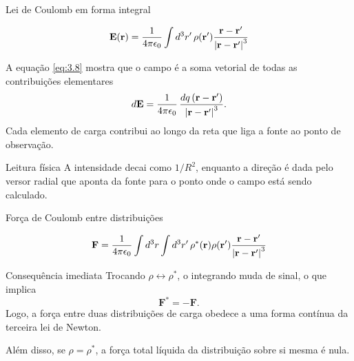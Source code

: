 \documentclass[aspectratio=169,11pt]{beamer}
\newcommand{\E}{\mathbf{E}}
\newcommand{\F}{\mathbf{F}}
\newcommand{\rr}{\mathbf{r}}
\begin{document}
\begin{frame}{Lei de Coulomb em forma integral}
\begin{eqbox}
\begin{equation}
\E(\rr)=
\frac{1}{4\pi\epsilon_0}
\int d^3r'\,\rho(\rr')
\frac{\rr-\rr'}{\abs{\rr-\rr'}^3}
\label{eq:3.8}
\end{equation}
\end{eqbox}

\vspace{0.1cm}

\begin{mybox}
\justifying
A equação \eqref{eq:3.8} mostra que o campo é a soma vetorial de todas as contribuições elementares
\[
d\E=
\frac{1}{4\pi\epsilon_0}\,
\frac{dq\,(\rr-\rr')}{\abs{\rr-\rr'}^3}.
\]
Cada elemento de carga contribui ao longo da reta que liga a fonte ao ponto de observação.
\end{mybox}

\vspace{0.1cm}

\begin{alertblock}{Leitura física}
\justifying
A intensidade decai como \(1/R^2\), enquanto a direção é dada pelo versor radial que aponta da fonte para o ponto onde o campo está sendo calculado.
\end{alertblock}
\end{frame}

\begin{frame}{Força de Coulomb entre distribuições}
\begin{eqbox}
\begin{equation}
\F=
\frac{1}{4\pi\epsilon_0}
\int d^3r \int d^3r'\,
\rho^\ast(\rr)\rho(\rr')
\frac{\rr-\rr'}{\abs{\rr-\rr'}^3}
\label{eq:3.9}
\end{equation}
\end{eqbox}

\vspace{0.25cm}

\begin{block}{Consequência imediata}
\justifying
Trocando \(\rho\leftrightarrow \rho^\ast\), o integrando muda de sinal, o que implica
\[
\F^\ast=-\F.
\]
Logo, a força entre duas distribuições de carga obedece a uma forma contínua da terceira lei de Newton.
\end{block}

\begin{mybox}
\justifying
Além disso, se \(\rho=\rho^\ast\), a força total líquida da distribuição sobre si mesma é nula.
\end{mybox}
\end{frame}
\end{document}
